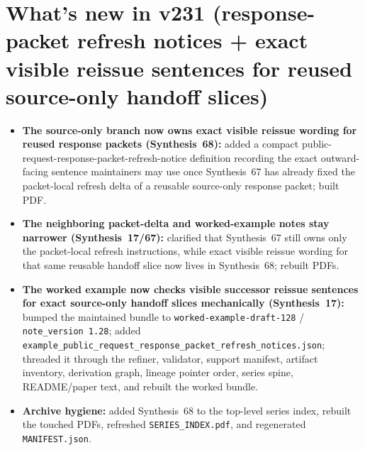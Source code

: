 \documentclass[11pt]{article}
\begin{document}
\section{What's new in v231 (response-packet refresh notices + exact visible reissue sentences for reused source-only handoff slices)}
\begin{itemize}[leftmargin=*]
\item \textbf{The source-only branch now owns exact visible reissue wording for reused response packets (Synthesis~68):} added a compact public-request-response-packet-refresh-notice definition recording the exact outward-facing sentence maintainers may use once Synthesis~67 has already fixed the packet-local refresh delta of a reusable source-only response packet; built PDF.
\item \textbf{The neighboring packet-delta and worked-example notes stay narrower (Synthesis~17/67):} clarified that Synthesis~67 still owns only the packet-local refresh instructions, while exact visible reissue wording for that same reusable handoff slice now lives in Synthesis~68; rebuilt PDFs.
\item \textbf{The worked example now checks visible successor reissue sentences for exact source-only handoff slices mechanically (Synthesis~17):} bumped the maintained bundle to \texttt{worked-example-draft-128} / \texttt{note\_version 1.28}; added \texttt{example\_public\_request\_response\_packet\_refresh\_notices.json}; threaded it through the refiner, validator, support manifest, artifact inventory, derivation graph, lineage pointer order, series spine, README/paper text, and rebuilt the worked bundle.
\item \textbf{Archive hygiene:} added Synthesis~68 to the top-level series index, rebuilt the touched PDFs, refreshed \texttt{SERIES\_INDEX.pdf}, and regenerated \texttt{MANIFEST.json}.
\end{itemize}
\end{document}
